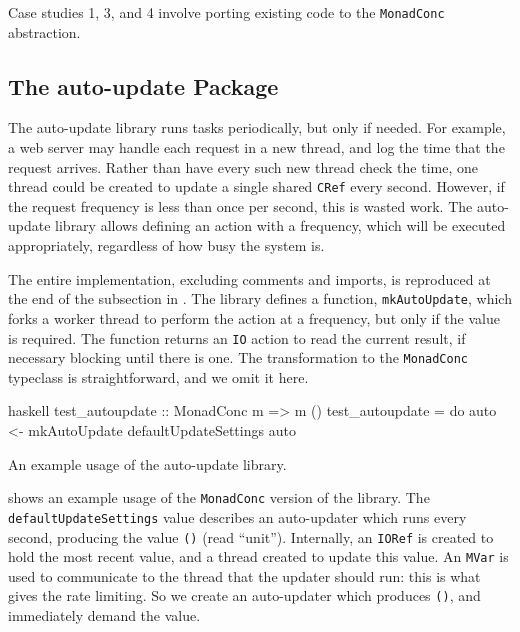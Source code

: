 Case studies 1, 3, and 4 involve porting existing code to the
\verb|MonadConc| abstraction.

\subsection{The auto-update Package}

The auto-update library\cite{auto_update} runs tasks periodically, but
only if needed.  For example, a web server may handle each request in
a new thread, and log the time that the request arrives.  Rather than
have every such new thread check the time, one thread could be created
to update a single shared \verb|CRef| every second.  However, if the
request frequency is less than once per second, this is wasted work.
The auto-update library allows defining an action with a frequency,
which will be executed appropriately, regardless of how busy the
system is.

The entire implementation, excluding comments and imports, is
reproduced at the end of the subsection in .  The
library defines a function, \verb|mkAutoUpdate|, which forks a worker
thread to perform the action at a frequency, but only if the value is
required.  The function returns an \verb|IO| action to read the
current result, if necessary blocking until there is one.  The
transformation to the \verb|MonadConc| typeclass is straightforward,
and we omit it here.

\begin{listing}
\centering
\begin{cminted}{haskell}
test_autoupdate :: MonadConc m => m ()
test_autoupdate = do
  auto <- mkAutoUpdate defaultUpdateSettings
  auto
\end{cminted}
\caption{An example usage of the auto-update library.}\label{lst:autoupdate_example1}
\end{listing}

 shows an example usage of the
\verb|MonadConc| version of the library.  The
\verb|defaultUpdateSettings| value describes an auto-updater which
runs every second, producing the value \verb|()| (read ``unit'').
Internally, an \verb|IORef| is created to hold the most recent value,
and a thread created to update this value.  An \verb|MVar| is used to
communicate to the thread that the updater should run: this is what
gives the rate limiting.  So we create an auto-updater which produces
\verb|()|, and immediately demand the value.

